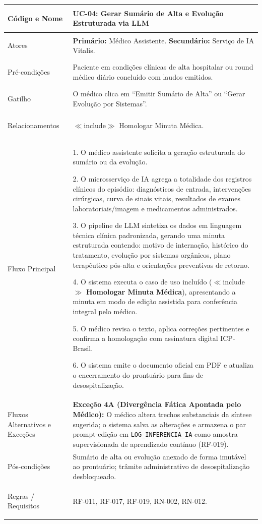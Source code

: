 \begingroup
\small
\begin{tabularx}{\textwidth}{>{\bfseries\raggedright\arraybackslash}p{3.4cm} X}
\toprule
Código e Nome & UC-04: Gerar Sumário de Alta e Evolução Estruturada via LLM \\
\midrule
Atores & \textbf{Primário:} Médico Assistente. \textbf{Secundário:} Serviço de IA Vitalis. \\
Pré-condições & Paciente em condições clínicas de alta hospitalar ou round médico diário concluído com laudos emitidos. \\
Gatilho & O médico clica em ``Emitir Sumário de Alta'' ou ``Gerar Evolução por Sistemas''. \\
Relacionamentos & $\ll$include$\gg$ Homologar Minuta Médica. \\
\midrule
Fluxo Principal & 
1. O médico assistente solicita a geração estruturada do sumário ou da evolução.\par
2. O microsserviço de IA agrega a totalidade dos registros clínicos do episódio: diagnósticos de entrada, intervenções cirúrgicas, curva de sinais vitais, resultados de exames laboratoriais/imagem e medicamentos administrados.\par
3. O pipeline de LLM sintetiza os dados em linguagem técnica clínica padronizada, gerando uma minuta estruturada contendo: motivo de internação, histórico do tratamento, evolução por sistemas orgânicos, plano terapêutico pós-alta e orientações preventivas de retorno.\par
4. O sistema executa o caso de uso incluído ($\ll$include$\gg$ \textbf{Homologar Minuta Médica}), apresentando a minuta em modo de edição assistida para conferência integral pelo médico.\par
5. O médico revisa o texto, aplica correções pertinentes e confirma a homologação com assinatura digital ICP-Brasil.\par
6. O sistema emite o documento oficial em PDF e atualiza o encerramento do prontuário para fins de desospitalização. \\
\midrule
Fluxos Alternativos e Exceções & 
\textbf{Exceção 4A (Divergência Fática Apontada pelo Médico):} O médico altera trechos substanciais da síntese sugerida; o sistema salva as alterações e armazena o par prompt-edição em \texttt{LOG\_INFERENCIA\_IA} como amostra supervisionada de aprendizado contínuo (RF-019). \\
\midrule
Pós-condições & Sumário de alta ou evolução anexado de forma imutável ao prontuário; trâmite administrativo de desospitalização desbloqueado. \\
Regras / Requisitos & RF-011, RF-017, RF-019, RN-002, RN-012. \\
\bottomrule
\end{tabularx}
\endgroup

